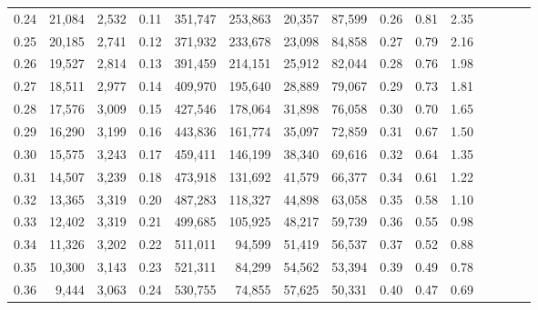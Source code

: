 \begin{tabular}{rrrcrrrrrrrrrrr}
0.24 &  21,084 &  2,532 &                                       0.11 &  351,747 &  253,863 &   20,357 &   87,599 &  0.26 &  0.81 &                         2.35 \\
0.25 &  20,185 &  2,741 &                                       0.12 &  371,932 &  233,678 &   23,098 &   84,858 &  0.27 &  0.79 &                         2.16 \\
0.26 &  19,527 &  2,814 &                                       0.13 &  391,459 &  214,151 &   25,912 &   82,044 &  0.28 &  0.76 &                         1.98 \\
0.27 &  18,511 &  2,977 &                                       0.14 &  409,970 &  195,640 &   28,889 &   79,067 &  0.29 &  0.73 &                         1.81 \\
0.28 &  17,576 &  3,009 &                                       0.15 &  427,546 &  178,064 &   31,898 &   76,058 &  0.30 &  0.70 &                         1.65 \\
0.29 &  16,290 &  3,199 &                                       0.16 &  443,836 &  161,774 &   35,097 &   72,859 &  0.31 &  0.67 &                         1.50 \\
0.30 &  15,575 &  3,243 &                                       0.17 &  459,411 &  146,199 &   38,340 &   69,616 &  0.32 &  0.64 &                         1.35 \\
0.31 &  14,507 &  3,239 &                                       0.18 &  473,918 &  131,692 &   41,579 &   66,377 &  0.34 &  0.61 &                         1.22 \\
0.32 &  13,365 &  3,319 &                                       0.20 &  487,283 &  118,327 &   44,898 &   63,058 &  0.35 &  0.58 &                         1.10 \\
0.33 &  12,402 &  3,319 &                                       0.21 &  499,685 &  105,925 &   48,217 &   59,739 &  0.36 &  0.55 &                         0.98 \\
0.34 &  11,326 &  3,202 &                                       0.22 &  511,011 &   94,599 &   51,419 &   56,537 &  0.37 &  0.52 &                         0.88 \\
0.35 &  10,300 &  3,143 &                                       0.23 &  521,311 &   84,299 &   54,562 &   53,394 &  0.39 &  0.49 &                         0.78 \\
0.36 &   9,444 &  3,063 &                                       0.24 &  530,755 &   74,855 &   57,625 &   50,331 &  0.40 &  0.47 &                         0.69 \\

\end{tabular}
